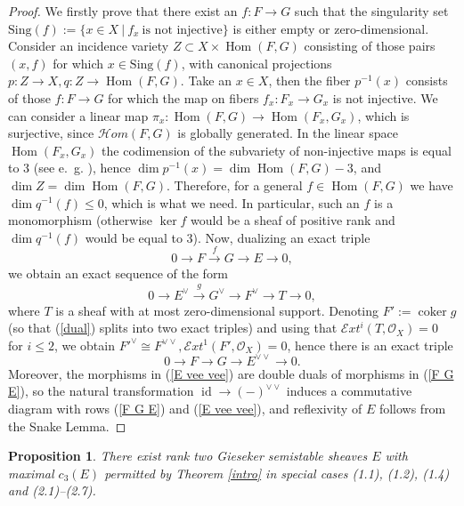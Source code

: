 \documentclass{amsart}
\DeclareMathOperator{\Hom}{Hom}
\DeclareMathOperator{\coker}{coker}
\def\id{\mathop{\mathrm{id}}\nolimits}
\newtheorem{proposition}[theorem]{Proposition}
\begin{document}
	\begin{proof}
	We firstly prove that there exist an $f:F\to G$ such that the singularity set $\mathrm{Sing}(f):=\{x\in X\ |\ f_x\ \text{is not injective}\}$ is either empty or zero-dimensional. Consider an incidence variety $Z\subset X\times\Hom(F,G)$ consisting of those pairs $(x,f)$ for which $x\in\mathrm{Sing}(f)$, with canonical projections $p:Z\to X,q:Z\to\Hom(F,G)$. Take an $x\in X$, then the fiber $p^{-1}(x)$ consists of those $f:F\to G$ for which the map on fibers $f_x:F_x\to G_x$ is not injective. We can consider a linear map $\pi_x:\Hom(F,G)\to\Hom(F_x,G_x)$, which is surjective, since $\mathcal Hom(F,G)$ is globally generated. In the linear space $\Hom(F_x,G_x)$ the codimension of the subvariety of non-injective maps is equal to 3 (see e.~g. \cite{Hirschowitz}), hence $\dim p^{-1}(x)=\dim \Hom(F,G)-3$, and $\dim Z=\dim \Hom(F,G)$. Therefore, for a general $f\in\Hom(F,G)$ we have $\dim q^{-1}(f)\le 0$, which is what we need. In particular, such an $f$ is a monomorphism (otherwise $\ker f$ would be a sheaf of positive rank and $\dim q^{-1}(f)$ would be equal to 3). Now, dualizing an exact triple
	\begin{equation}\label{F G E}0\to F\overset{f}{\to} G\to E\to 0,\end{equation} 
	we obtain an exact sequence of the form 
	\begin{equation}\label{dual}0\to E^\vee\overset{g}{\to} G^\vee\to F^\vee\to T\to 0,\end{equation} 
	where $T$ is a sheaf with at most zero-dimensional support. Denoting $F':=\coker g$ (so that (\ref{dual}) splits into two exact triples) and using that $\mathcal Ext^i(T,\mathcal O_X)=0$ for $i\le 2$, we obtain $F'^\vee\cong F^{\vee\vee},\mathcal Ext^1(F',\mathcal O_X)=0$, hence there is an exact triple
	\begin{equation}\label{E vee vee}0\to F\to G\to E^{\vee\vee}\to 0.\end{equation}
	Moreover, the morphisms in (\ref{E vee vee}) are double duals of morphisms in (\ref{F G E}), so the natural transformation $\id\to(-)^{\vee\vee}$ induces a commutative diagram with rows (\ref{F G E}) and (\ref{E vee vee}), and reflexivity of $E$ follows from the Snake Lemma.
	\end{proof}
	
	\begin{proposition}\label{existence}There exist rank two Gieseker semistable sheaves $E$ with maximal $c_3(E)$ permitted by Theorem \ref{intro} in special cases (1.1), (1.2), (1.4) and (2.1)--(2.7).
	\end{proposition}
	
\end{document}
